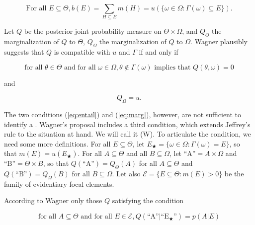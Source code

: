 \documentclass[11pt]{article}
\begin{document}
\begin{equation}
  \mbox{For all }E\subseteq{}\Theta, b(E)=\sum_{H\subseteq{}E}m(H)=u(\{\omega\in\Omega:\Gamma(\omega)\subseteq{}E\})\label{eq:bof}.
\end{equation}

Let $Q$ be the posterior joint probability measure on
$\Theta\times\Omega$, and $Q_{\Theta}$ the marginalization of $Q$ to
$\Theta$, $Q_{\Omega}$ the marginalization of $Q$ to $\Omega$.
Wagner plausibly suggests that $Q$ is compatible with $u$ and $\Gamma$
if and only if

\begin{equation}
  \label{eq:entail}
  \mbox{for all }\theta\in\Theta\mbox{ and for all
  }\omega\in\Omega,\theta\notin\Gamma(\omega)\mbox{ implies that }Q(\theta,\omega)=0
\end{equation}

and

\begin{equation}
  \label{eq:marg}
  Q_{\Omega}=u.
\end{equation}

The two conditions (\ref{eq:entail}) and (\ref{eq:marg}), however, are
not sufficient to identify a  . Wagner's proposal includes a third
condition, which extends Jeffrey's rule to the situation at hand. We
will call it (W). To articulate the condition, we need some more
definitions. For all $E\subseteq{}\Theta$, let
$E_{\bigstar}=\{\omega\in\Omega:\Gamma(\omega)=E\}$, so that
$m(E)=u(E_{\bigstar})$. For all $A\subseteq\Theta$ and all
$B\subseteq\Omega$, let $\mbox{``A''}=A\times\Omega$ and
$\mbox{``B''}=\Theta\times{}B$, so that
$Q(\mbox{``A''})=Q_{\Theta}(A)$ for all $A\subseteq\Theta$ and
$Q(\mbox{``B''})=Q_{\Omega}(B)$ for all $B\subseteq\Omega$. Let also
$\mathcal{E}=\{E\subseteq\Theta:m(E)>0\}$ be the family of evidentiary
focal elements.

According to Wagner only those $Q$ satisfying the condition

\begin{equation}
  \label{eq:wagn}
  \mbox{for all }A\subseteq\Theta\mbox{ and for all }E\in\mathcal{E},Q(\mbox{``A''}|\mbox{``E$_{\bigstar}$''})=p(A|E)
\end{equation}
\end{document}
